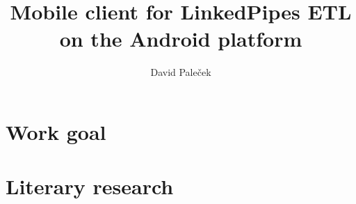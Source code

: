 \documentclass[thesis=B,english]{FITthesis}[2019/12/23]
\title{Mobile client for LinkedPipes ETL on the Android platform}
\author{David Paleček} %
\begin{document}

\begin{introduction}
	
\end{introduction}

%
%
%
%
%
%
%
%
%
%
%
%
%

\chapter{Work goal}


\chapter{Literary research}


%
%
\end{document}
